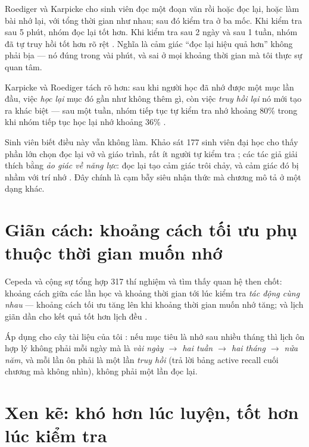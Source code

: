 \documentclass[../hieu-suat.tex]{subfiles}
\begin{document}
Roediger và Karpicke \cite{roediger2006} cho sinh viên đọc một đoạn văn rồi hoặc đọc lại, hoặc làm bài nhớ lại, với tổng thời gian như nhau; sau đó kiểm tra ở ba mốc. Khi kiểm tra sau 5 phút, nhóm đọc lại tốt hơn. Khi kiểm tra sau 2 ngày và sau 1 tuần, nhóm đã tự truy hồi tốt hơn rõ rệt \nD{}. Nghĩa là cảm giác ``đọc lại hiệu quả hơn'' không phải bịa --- nó đúng trong vài phút, và sai ở mọi khoảng thời gian mà tôi thực sự quan tâm.

Karpicke và Roediger \cite{karpicke2008} tách rõ hơn: sau khi người học đã nhớ được một mục lần đầu, việc \emph{học lại} mục đó gần như không thêm gì, còn việc \emph{truy hồi lại} nó mới tạo ra khác biệt --- sau một tuần, nhóm tiếp tục tự kiểm tra nhớ khoảng 80\% trong khi nhóm tiếp tục học lại nhớ khoảng 36\% \nD{}.

\begin{cambay}
Sinh viên biết điều này vẫn không làm. Khảo sát 177 sinh viên đại học cho thấy phần lớn chọn đọc lại vở và giáo trình, rất ít người tự kiểm tra \cite{karpicke2009} \nD{}; các tác giả giải thích bằng \emph{ảo giác về năng lực}: đọc lại tạo cảm giác trôi chảy, và cảm giác đó bị nhầm với trí nhớ \nT{}. Đây chính là cạm bẫy siêu nhận thức mà chương  mô tả ở một dạng khác.
\end{cambay}

\section{Giãn cách: khoảng cách tối ưu phụ thuộc thời gian muốn nhớ}

Cepeda và cộng sự \cite{cepeda2006} tổng hợp 317 thí nghiệm và tìm thấy quan hệ then chốt: khoảng cách giữa các lần học và khoảng thời gian tới lúc kiểm tra \emph{tác động cùng nhau} --- khoảng cách tối ưu tăng lên khi khoảng thời gian muốn nhớ tăng; và lịch giãn dần cho kết quả tốt hơn lịch đều \nD{}.

Áp dụng cho cây tài liệu của tôi \nM{}: nếu mục tiêu là nhớ sau nhiều tháng thì lịch ôn hợp lý không phải mỗi ngày mà là \emph{vài ngày \(\rightarrow\) hai tuần \(\rightarrow\) hai tháng \(\rightarrow\) nửa năm}, và mỗi lần ôn phải là một lần \emph{truy hồi} (trả lời bảng active recall cuối chương mà không nhìn), không phải một lần đọc lại.

\section{Xen kẽ: khó hơn lúc luyện, tốt hơn lúc kiểm tra}
\end{document}
